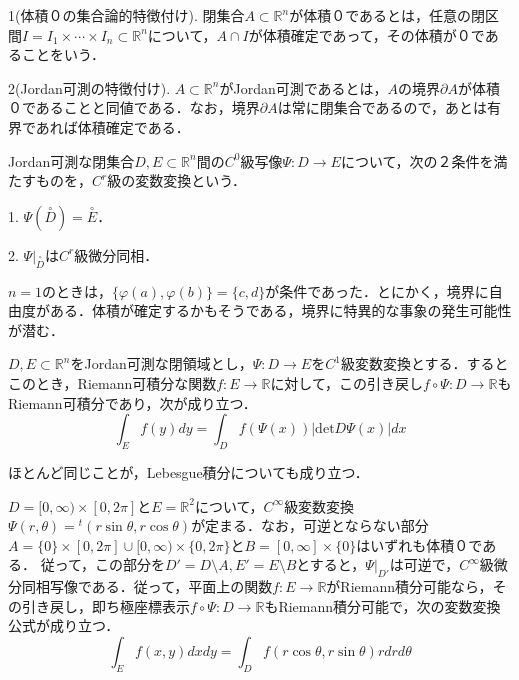 \documentclass[uplatex, dvipdfmx]{jsreport}
\begin{document}
\begin{proposition}[Jordan可測の位相的特徴付け]
    1(体積０の集合論的特徴付け). 閉集合$A\subset\mathbb{R}^n$が体積０であるとは，任意の閉区間$I=I_1\times\cdots\times I_n\subset\mathbb{R}^n$について，$A\cap I$が体積確定であって，その体積が０であることをいう．

    2(Jordan可測の特徴付け). $A\subset\mathbb{R}^n$がJordan可測であるとは，$A$の境界$\partial A$が体積０であることと同値である．なお，境界$\partial A$は常に閉集合であるので，あとは有界であれば体積確定である．
\end{proposition}

\begin{definition}[一般の変数変換]
    Jordan可測な閉集合$D,E\subset\mathbb{R}^n$間の$C^0$級写像$\Psi:D\to E$について，次の２条件を満たすものを，$C^r$級の変数変換という．

    1. $\Psi(\overset{\circ}{D})=\overset{\circ}{E}$．

    2. $\Psi|_{\overset{\circ}{D}}$は$C^r$級微分同相．
\end{definition}
\begin{remark*}
    $n=1$のときは，$\{\varphi(a),\varphi(b)\}=\{c,d\}$が条件であった．とにかく，境界に自由度がある．体積が確定するかもそうである，境界に特異的な事象の発生可能性が潜む．
\end{remark*}

\begin{theorem}[重積分の変数変換公式]
    $D,E\subset\mathbb{R}^n$をJordan可測な閉領域とし，$\Psi:D\to E$を$C^1$級変数変換とする．するとこのとき，Riemann可積分な関数$f:E\to\mathbb{R}$に対して，この引き戻し$f\circ\Psi:D\to\mathbb{R}$もRiemann可積分であり，次が成り立つ．
    \[ \int_Ef(y)dy = \int_Df(\Psi(x))|\mathrm{det}D\Psi(x)|dx \]
\end{theorem}
\begin{remark}
    ほとんど同じことが，Lebesgue積分についても成り立つ．
\end{remark}
\begin{example}[２次元極座標]
    $D=[0,\infty)\times [0,2\pi]$と$E=\mathbb{R}^2$について，$C^\infty$級変数変換$\Psi(r,\theta)={}^t(r\sin\theta,r\cos\theta)$が定まる．なお，可逆とならない部分$A=\{0\}\times [0,2\pi]\cup [0,\infty)\times \{0,2\pi\}$と$B=[0,\infty]\times\{0\}$はいずれも体積０である．
    従って，この部分を$D'=D\setminus A,E'=E\setminus B$とすると，$\Psi|_{D'}$は可逆で，$C^\infty$級微分同相写像である．従って，平面上の関数$f:E\to\mathbb{R}$がRiemann積分可能なら，その引き戻し，即ち極座標表示$f\circ\Psi:D\to\mathbb{R}$もRiemann積分可能で，次の変数変換公式が成り立つ．
    \[ \int_Ef(x,y)dxdy = \int_Df(r\cos\theta,r\sin\theta)rdrd\theta \]
\end{example}
\end{document}
